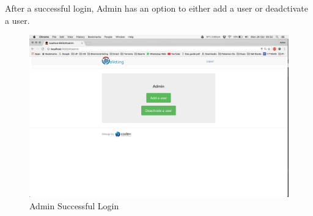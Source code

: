 \documentclass[11pt]{article}
\begin{document}
				After a successful login, Admin has an option to either add a user or deadctivate a user.
				\begin{figure}[H]
					\centering
					\includegraphics[width=0.7\linewidth]{../Images/UserManual/adminWeb/adminsuccessfullogin.png}
					\caption{Admin Successful Login}
				\end{figure}
				
\end{document}
